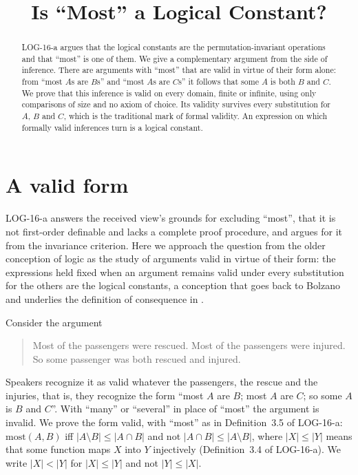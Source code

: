 \documentclass{situationist-preprint}
\title{Is \enquote{Most} a Logical Constant?}
\begin{document}
\maketitle

\begin{abstract}
LOG-16-a argues that the logical constants are the permutation-invariant operations and that \enquote{most} is one of them. We give a complementary argument from the side of inference. There are arguments with \enquote{most} that are valid in virtue of their form alone: from \enquote{most $A$s are $B$s} and \enquote{most $A$s are $C$s} it follows that some $A$ is both $B$ and $C$. We prove that this inference is valid on every domain, finite or infinite, using only comparisons of size and no axiom of choice. Its validity survives every substitution for $A$, $B$ and $C$, which is the traditional mark of formal validity. An expression on which formally valid inferences turn is a logical constant.
\end{abstract}

\section{A valid form}

LOG-16-a answers the received view's grounds for excluding \enquote{most}, that it is not first-order definable \citep{BarwiseCooper1981} and lacks a complete proof procedure, and argues for it from the invariance criterion. Here we approach the question from the older conception of logic as the study of arguments valid in virtue of their form: the expressions held fixed when an argument remains valid under every substitution for the others are the logical constants, a conception that goes back to Bolzano and underlies the definition of consequence in \citet{Tarski1936}.

Consider the argument
\begin{quote}
Most of the passengers were rescued. Most of the passengers were injured. So some passenger was both rescued and injured.
\end{quote}
Speakers recognize it as valid whatever the passengers, the rescue and the injuries, that is, they recognize the form \enquote{most $A$ are $B$; most $A$ are $C$; so some $A$ is $B$ and $C$}. With \enquote{many} or \enquote{several} in place of \enquote{most} the argument is invalid. We prove the form valid, with \enquote{most} as in Definition~3.5 of LOG-16-a: $\mathrm{most}(A, B)$ iff $|A \setminus B| \leq |A \cap B|$ and not $|A \cap B| \leq |A \setminus B|$, where $|X| \leq |Y|$ means that some function maps $X$ into $Y$ injectively (Definition~3.4 of LOG-16-a). We write $|X| < |Y|$ for $|X| \leq |Y|$ and not $|Y| \leq |X|$.
\end{document}
